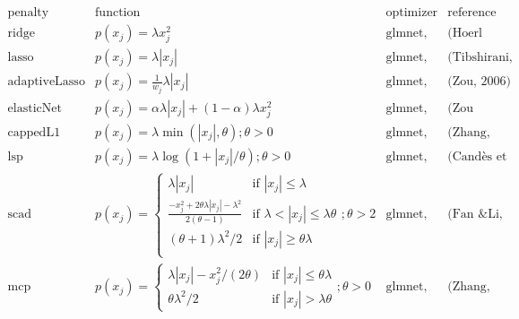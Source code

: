 \documentclass[preview]{standalone}
\begin{document}
$$
\begin{array}{l|llll}
	\text{penalty} & \text{function} & \text{optimizer} & \text{reference}\\
	\hline
	\text{ridge} & p( x_j) = \lambda x_j^2 & \text{glmnet, ista} & \text{(Hoerl \& Kennard, 1970)}\\
	\text{lasso} & p( x_j) = \lambda| x_j| & \text{glmnet, ista} & \text{(Tibshirani, 1996)}\\
	\text{adaptiveLasso} & p( x_j) = \frac{1}{w_j}\lambda| x_j| & \text{glmnet, ista} & \text{(Zou, 2006)}\\
	\text{elasticNet} & p( x_j) = \alpha\lambda| x_j| + (1-\alpha)\lambda x_j^2 & \text{glmnet, ista} & \text{(Zou \& Hastie, 2005)}\\
	\text{cappedL1} & p( x_j) = \lambda \min(| x_j|, \theta); \theta > 0 &\text{glmnet, ista}& \text{(Zhang, 2010)}\\
	\text{lsp} & p( x_j) = \lambda \log(1 + |x_j|/\theta); \theta > 0 &\text{glmnet, ista}& \text{(Candès et al., 2008)} \\
	\text{scad} & p( x_j) = \begin{cases}
		\lambda |x_j| & \text{if } |x_j| \leq \lambda\\
		\frac{-x_j^2 + 2\theta\lambda |x_j| - \lambda^2}{2(\theta -1)} & \text{if } \lambda < |x_j| \leq \lambda\theta \\
		(\theta + 1) \lambda^2/2 & \text{if } |x_j| \geq \theta\lambda\\
	\end{cases}; \theta > 2 &\text{glmnet, ista}& \text{(Fan \& Li, 2001)} \\
	\text{mcp} & p( x_j) = 
	\begin{cases}
		\lambda |x_j| - x_j^2/(2\theta) & \text{if } |x_j| \leq \theta\lambda\\
		\theta\lambda^2/2 & \text{if } |x_j| > \lambda\theta
	\end{cases}; \theta > 0 &\text{glmnet, ista}& \text{(Zhang, 2010)}
\end{array}
$$
\end{document}

